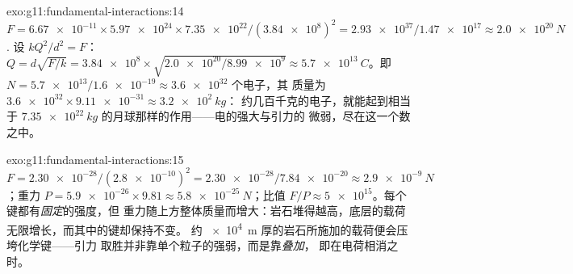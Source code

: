 \begin{solution}{exo:g11:fundamental-interactions:14}
$F = \num{6.67e-11} \times \num{5.97e24} \times \num{7.35e22} /
(\num{3.84e8})^2 = \num{2.93e37}/\num{1.47e17} \approx \qty{2.0e20}{N}$.
设 $kQ^2/d^2 = F$：
$Q = d\sqrt{F/k} = \num{3.84e8} \times \sqrt{\num{2.0e20}/\num{8.99e9}}
\approx \qty{5.7e13}{C}$。即
$N = \num{5.7e13}/\num{1.6e-19} \approx \num{3.6e32}$ 个电子，其
质量为 $\num{3.6e32} \times \num{9.11e-31} \approx \qty{3.2e2}{kg}$：
约几百千克的电子，就能起到相当于
$\qty{7.35e22}{kg}$ 的月球那样的作用——电的强大与引力的
微弱，尽在这一个数之中。
\end{solution}

\begin{solution}{exo:g11:fundamental-interactions:15}
$F = \num{2.30e-28}/(\num{2.8e-10})^2 = \num{2.30e-28}/\num{7.84e-20}
\approx \qty{2.9e-9}{N}$；重力
$P = \num{5.9e-26} \times 9.81 \approx \qty{5.8e-25}{N}$；比值
$F/P \approx \num{5e15}$。每个键都有\emph{固定}的强度，但
重力随上方整体质量而增大：岩石堆得越高，底层的载荷
无限增长，而其中的键却保持不变。
约 \qty{e4}{m} 厚的岩石所施加的载荷便会压垮化学键——引力
取胜并非靠单个粒子的强弱，而是靠\emph{叠加}，
即在电荷相消之时。
\end{solution}

